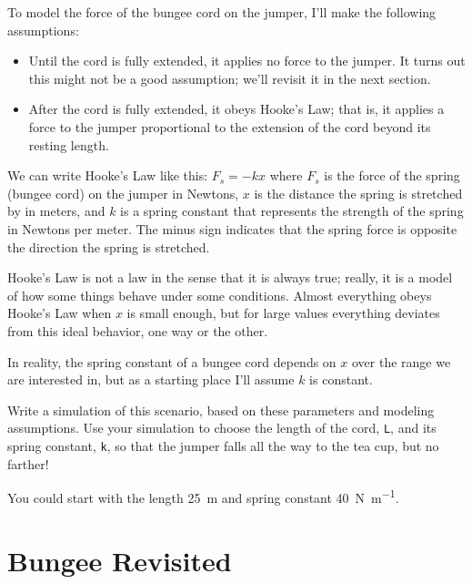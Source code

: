 To model the force of the bungee cord on the jumper, I'll make the following assumptions:

\begin{itemize}

\item Until the cord is fully extended, it applies no force to the jumper.  It turns out this might not be a good assumption; we'll revisit it in the next section.

\item After the cord is fully extended, it obeys Hooke's Law; that is, it applies a force to the jumper proportional to the extension of the cord beyond its resting length.

\end{itemize}

We can write Hooke's Law like this:
%
$F_s = -k x$
%
where $F_s$ is the force of the spring (bungee cord) on the jumper in Newtons, $x$ is the distance the spring is stretched by in meters, and $k$ is a spring constant that represents the strength of the spring in Newtons per meter.
The minus sign indicates that the spring force is opposite the direction the spring is stretched.


Hooke's Law is not a law in the sense that it is always true; really, it is a model of how some things behave under some conditions.
Almost everything obeys Hooke's Law when $x$ is small enough, but for large values everything deviates from this ideal behavior, one way or the other.

In reality, the spring constant of a bungee cord depends on $x$ over the range we are interested in, but as a starting place I'll assume $k$ is constant.



\begin{ex}

Write a simulation of this scenario, based on these parameters and modeling assumptions.
Use your simulation to choose the length of the cord, {\tt L}, and its spring constant, {\tt k}, so that the jumper falls all the way to the tea cup, but no farther!

You could start with the length \SI{25}{\meter} and spring constant \SI{40}{\newton \per \meter}.

\end{ex}


\section{Bungee Revisited}

